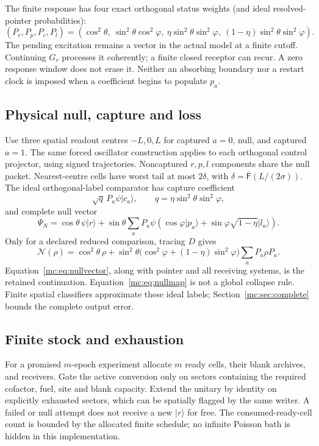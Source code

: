\documentclass[11pt,oneside,openany]{book}
\theoremstyle{definition}
\theoremstyle{remark}\newtheorem{remark}[theorem]{Remark}
\providecommand{\ket}[1]{\lvert#1\rangle}
\providecommand{\mcNtail}{\overline{\mathsf F}}
\begin{document}
The finite response has four exact orthogonal status weights (and ideal resolved-pointer probabilities):
\begin{equation}\label{mc:eq:statuses}
 (P_r,P_p,P_c,P_l)=
 (\cos^2\theta,\ \sin^2\theta\cos^2\varphi,\
 \eta\sin^2\theta\sin^2\varphi,\ (1-\eta)\sin^2\theta\sin^2\varphi).
\end{equation}
The pending excitation remains a vector in the actual model at a finite cutoff. Continuing $G_r$ processes it coherently; a finite closed receptor can recur. A zero response window does not erase it. Neither an absorbing boundary nor a restart clock is imposed when a coefficient begins to populate $p_a$.

\subsection{Physical null, capture and loss}
Use three spatial readout centres $-L,0,L$ for captured $a=0$, null, and captured $a=1$. The same forced oscillator construction applies to each orthogonal control projector, using signed trajectories. Noncaptured $r,p,l$ components share the null packet. Nearest-centre cells have worst tail at most $2\delta$, with $\delta=\mcNtail(L/(2\sigma))$. The ideal orthogonal-label comparator has capture coefficient
\[
 \sqrt q\,P_a\psi\ket{c_a},\qquad q=\eta\sin^2\theta\sin^2\varphi,
\]
and complete null vector
\begin{equation}\label{mc:eq:nullvector}
 \Psi_N=\cos\theta\,\psi\ket r+
 \sin\theta\sum_aP_a\psi\left(\cos\varphi\ket{p_a}
                 +\sin\varphi\sqrt{1-\eta}\ket{l_a}\right).
\end{equation}
Only for a declared reduced comparison, tracing $D$ gives
\begin{equation}\label{mc:eq:nullmap}
 \mathcal N(\rho)=\cos^2\theta\,\rho+
 \sin^2\theta\bigl(\cos^2\varphi+(1-\eta)\sin^2\varphi\bigr)
                  \sum_aP_a\rho P_a.
\end{equation}
Equation~\eqref{mc:eq:nullvector}, along with pointer and all receiving systems, is the retained continuation. Equation~\eqref{mc:eq:nullmap} is not a global collapse rule. Finite spatial classifiers approximate these ideal labels; Section~\ref{mc:sec:complete} bounds the complete output error.

\subsection{Finite stock and exhaustion}
For a promised $m$-epoch experiment allocate $m$ ready cells, their blank archives, and receivers. Gate the active conversion only on sectors containing the required cofactor, fuel, site and blank capacity. Extend the unitary by identity on explicitly exhausted sectors, which can be spatially flagged by the same writer. A failed or null attempt does not receive a new $\ket r$ for free. The consumed-ready-cell count is bounded by the allocated finite schedule; no infinite Poisson bath is hidden in this implementation.
\end{document}
